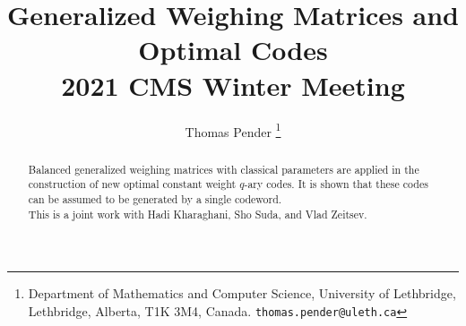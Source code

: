 \documentclass[a4paper,10pt]{article}
\title{Generalized Weighing Matrices and Optimal Codes\\\large 2021 CMS Winter Meeting}
\author{\large Thomas Pender \thanks{Department of Mathematics and Computer Science, University of Lethbridge,
Lethbridge, Alberta, T1K 3M4, Canada. \texttt{thomas.pender@uleth.ca}}}
\date{}
\begin{document}
\maketitle

\begin{abstract}
Balanced generalized weighing matrices with classical parameters are applied in the construction of new optimal constant weight $q$-ary codes. It is shown that these codes can be assumed to be generated by a single codeword. \\

This is a joint work with Hadi Kharaghani, Sho Suda, and Vlad Zeitsev.
\end{abstract}
\end{document}
